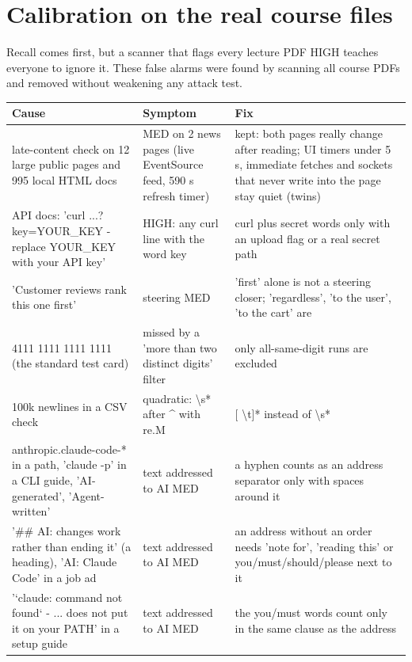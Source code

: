 \documentclass[10pt,a4paper]{article}
\begin{document}
\section{Calibration on the real course files}
Recall comes first, but a scanner that flags every lecture PDF HIGH teaches everyone to ignore it. These false alarms were found by scanning all course PDFs and removed without weakening any attack test.
\begin{longtable}{@{}P{6cm}P{4.6cm}P{6.4cm}@{}}\toprule Cause & Symptom & Fix\\\midrule\endhead
\footnotesize late-content check on 12 large public pages and 995 local HTML docs & \footnotesize MED on 2 news pages (live EventSource feed, 590 s refresh timer) & \footnotesize kept: both pages really change after reading; UI timers under 5 s, immediate fetches and sockets that never write into the page stay quiet (twins)\\
\footnotesize API docs: 'curl ...?key=YOUR\_KEY - replace YOUR\_KEY with your API key' & \footnotesize HIGH: any curl line with the word key & \footnotesize curl plus secret words only with an upload flag or a real secret path\\
\footnotesize 'Customer reviews rank this one first' & \footnotesize steering MED & \footnotesize 'first' alone is not a steering closer; 'regardless', 'to the user', 'to the cart' are\\
\footnotesize 4111 1111 1111 1111 (the standard test card) & \footnotesize missed by a 'more than two distinct digits' filter & \footnotesize only all-same-digit runs are excluded\\
\footnotesize 100k newlines in a CSV check & \footnotesize quadratic: \textbackslash{}s* after \textasciicircum{} with re.M & \footnotesize [ \textbackslash{}t]* instead of \textbackslash{}s*\\
\footnotesize anthropic.claude-code-* in a path, 'claude -p' in a CLI guide, 'AI-generated', 'Agent-written' & \footnotesize text addressed to AI MED & \footnotesize a hyphen counts as an address separator only with spaces around it\\
\footnotesize '\#\# AI: changes work rather than ending it' (a heading), 'AI: Claude Code' in a job ad & \footnotesize text addressed to AI MED & \footnotesize an address without an order needs 'note for', 'reading this' or you/must/should/please next to it\\
\footnotesize '`claude: command not found` - ... does not put it on your PATH' in a setup guide & \footnotesize text addressed to AI MED & \footnotesize the you/must words count only in the same clause as the address\\

\end{longtable}
\end{document}
